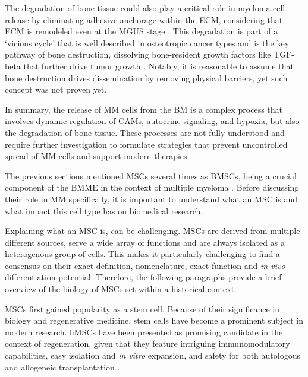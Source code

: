 The degradation of bone tissue could also play a critical role in myeloma cell
release by eliminating adhesive anchorage within the ECM, considering that
\ac{ECM} is remodeled even at the \ac{MGUS} stage
\citet{glaveyProteomicCharacterizationHuman2017}. This degradation is part of a
‘vicious cycle' that is well described in osteotropic cancer types and is the
key pathway of bone destruction, dissolving bone-resident growth factors like
\ac{TGF-beta} that further drive tumor growth
\cite{haradaMyelomaBoneInteraction2021, siclariMolecularInteractionsBreast2007,
    wangProstateCancerPromotes2019}. Notably, it is reasonable to assume that bone
destruction drives dissemination by removing physical barriers, yet such concept
was not proven yet.


In summary, the release of \ac{MM} cells from the \ac{BM} is a complex process
that involves dynamic regulation of \acp{CAM}, autocrine signaling, and hypoxia,
but also the degradation of bone tissue. These processes are not fully
understood and require further investigation to formulate strategies that
prevent uncontrolled spread of \ac{MM} cells and support modern therapies.







%
\label{sec:intro_hMSCs}%
The previous sections mentioned \acp{MSC} several times as \acp{BMSC}, being a
crucial component of the \ac{BMME} in the context of multiple myeloma
\cite{mangoliniBoneMarrowStromal2020}. Before discussing their role in \ac{MM}
specifically, it is important to understand what an \ac{MSC} is and what impact
this cell type has on biomedical research.

Explaining what an \ac{MSC} is, can be challenging. MSCs
are derived from multiple different sources, serve a wide array of functions and
are always isolated as a heterogenous group of cells. This makes it particularly
challenging to find a consensus on their exact definition, nomenclature, exact
function and \textit{in vivo} differentiation potential. Therefore, the
following paragraphs provide a brief overview of the biology of MSCs set within
a historical context.


\acp{MSC} first gained popularity as a stem cell. Because of their significance
in biology and regenerative medicine, stem cells have become a prominent subject
in modern research. \acp{hMSC} have been presented as promising candidate in the
context of regeneration, given that they feature intriguing immunomodulatory
capabilities, easy isolation and \textit{in vitro} expansion, and safety for
both autologous and allogeneic transplantation
\cite{ullahHumanMesenchymalStem2015}.



